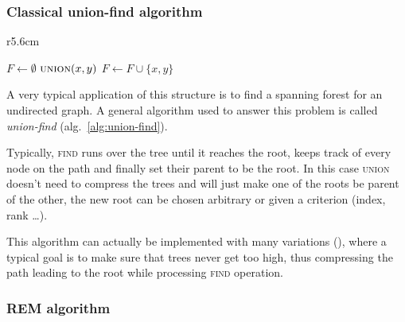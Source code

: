 \documentclass[12px]{article}
\begin{document}
      \subsubsection{Classical union-find algorithm}
        \setlength\intextsep{0pt}
        \begin{wrapfigure}{r}{5.6cm}
          \centering
          \begin{minipage}{\linewidth}
            \begin{algorithm}[H]
              \caption{General structure of Union-Find}%
              \label{alg:union-find}
              \begin{algorithmic}[1]
                \State $F \gets \emptyset$
                  \State {}
                \EndFor
                    \State $\Call{union}{x, y}$
                    \State $F \gets F \cup \{x, y\}$
                  \EndIf
                \EndFor
              \end{algorithmic}
            \end{algorithm}
          \end{minipage}
        \end{wrapfigure}

        A very typical application of this structure is to find a spanning forest for an undirected graph. 
        A general algorithm used to answer this problem is called \emph{union-find} (alg.~\ref{alg:union-find}).

        Typically, \textsc{find} runs over the tree until it reaches the root, keeps track of every node on the path and finally set their parent to be the root. In this case \textsc{union} doesn't need to compress the trees and will just make one of the roots be parent of the other, the new root can be chosen arbitrary or given a criterion (index, rank \dots).

        This algorithm can actually be implemented with many variations (), where a typical goal is to make sure that trees never get too high, thus compressing the path leading to the root while processing \textsc{find} operation.


      \subsubsection{REM algorithm}
\end{document}
